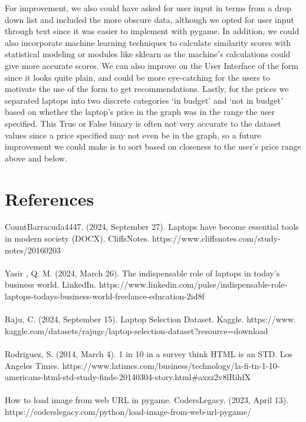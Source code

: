 \documentclass{article}
\begin{document}
\par For improvement, we also could have asked for user input in terms from a drop down list and included the more obscure data, although we opted for user input through text since it was easier to implement with pygame. In addition, we could also incorporate machine learning techniques to calculate similarity scores with statistical modeling or modules like sklearn as the machine’s calculations could give more accurate scores. We can also improve on the User Interface of the form since it looks quite plain, and could be more eye-catching for the users to motivate the use of the form to get recommendations. Lastly, for the prices we separated laptops into two discrete categories ‘in budget’ and ‘not in budget’ based on whether the laptop’s price in the graph was in the range the user specified. This True or False binary is often not very accurate to the dataset values since a price specified may not even be in the graph, so a future improvement we could make is to sort based on closeness to the user’s price range above and below. 

\section{References}
CountBarracuda4447. (2024, September 27). Laptops have become essential tools in modern society (DOCX). CliffsNotes. https://www.cliffsnotes.com/study-notes/20160203 
\\\\
Yasir , Q. M. (2024, March 26). The indispensable role of laptops in today’s business world. LinkedIn. https://www.linkedin.com/pulse/indispensable-role-laptops-todays-business-world-freelance-education-2id8f 
\\\\
Raju, C. (2024, September 15). Laptop Selection Dataset. Kaggle. https://www.\\kaggle.com/datasets/rajugc/laptop-selection-dataset?resource=download
\\\\
Rodriguez, S. (2014, March 4). 1 in 10 in a survey think HTML is an STD. Los Angeles Times. https://www.latimes.com/business/technology/la-fi-tn-1-10-americans-html-std-study-finds-20140304-story.html\#axzz2v8lRihfX 
\\\\
How to load image from web URL in pygame. CodersLegacy. (2023, April 13). https://coderslegacy.com/python/load-image-from-web-url-pygame/ 
\end{document}
